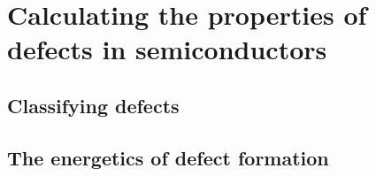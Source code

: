 
\clearpage

\section{Calculating the properties of defects in semiconductors}



\subsection{Classifying defects}





\subsection{The energetics of defect formation}






